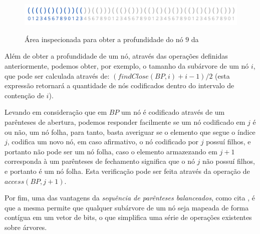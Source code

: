 \begin{figure}[!ht]
    \centering
      \caption[Representação de árvores com parênteses balanceados]{Área inspecionada para obter a profundidade do nó $9$ da }
      \includegraphics[width=\columnwidth]{images/excess-in-tree.png}
      \label{fig:excess-in-tree}
    \end{figure}

Além de obter a profundidade de um nó, através das operações definidas anteriormente, podemos obter, por exemplo, o tamanho da subárvore de um nó $i$, que pode ser calculada através de: $(findClose(BP,i)+i-1)/2$ (esta expressão retornará a quantidade de nós codificados dentro do intervalo de contenção de $i$). 

Levando em consideração que em $BP$ um nó é codificado através de um parênteses de abertura, podemos responder facilmente se um nó codificado em $j$ é ou não, um nó folha, para tanto, basta averiguar se o elemento que segue o índice $j$, codifica um novo nó, em caso afirmativo, o nó codificado por $j$ possuí filhos, e portanto não pode ser um nó folha, caso o elemento armazezando em $j+1$ corresponda à um parênteses de fechamento significa que o nó $j$ não possuí filhos, e portanto é um nó folha. Esta verificação pode ser feita através da operação de $access(BP,j+1)$.

Por fim, uma das vantagens da \textit{sequência de parênteses balanceados}, como cita \cite{book-compact-data-structures}, é que a mesma permite que qualquer subárvore de um nó seja mapeada de forma contígua em um vetor de bits, o que simplifica uma série de operações existentes sobre árvores.

